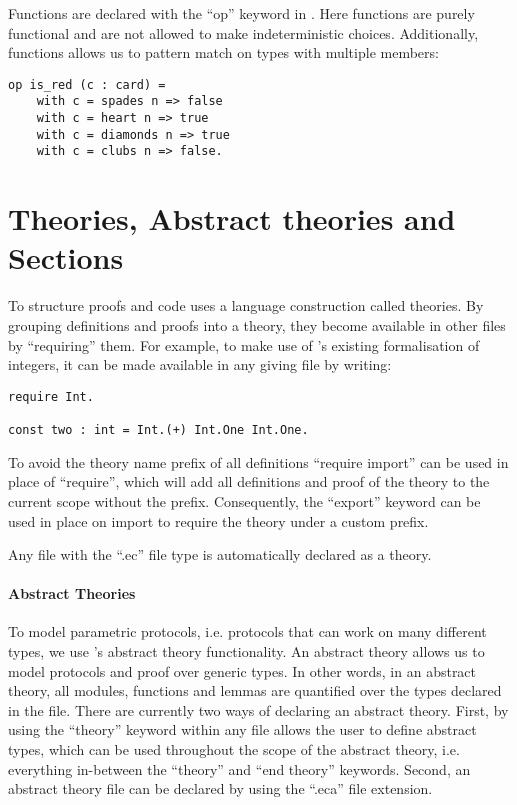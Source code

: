 \noindent
Functions are declared with the ``op'' keyword in \easycrypt.
Here functions are purely functional and are not allowed to make indeterministic
choices. Additionally, functions allows us to pattern match on types with
multiple members:
\begin{lstlisting}
op is_red (c : card) =
    with c = spades n => false
    with c = heart n => true
    with c = diamonds n => true
    with c = clubs n => false.
\end{lstlisting}


\section{Theories, Abstract theories and Sections}
\label{sec:ec_theories}
To structure proofs and code \easycrypt uses a language construction called
theories. By grouping definitions and proofs into a theory, they become available
in other files by ``requiring'' them. For example, to make use of \easycrypt's
existing formalisation of integers, it can be made available in any giving file
by writing:

\begin{lstlisting}[float,label=lst:theory_require,caption=\easycrypt theories: importing definitions]
require Int.

const two : int = Int.(+) Int.One Int.One.
\end{lstlisting}

To avoid the theory name prefix of all definitions ``require import'' can be
used in place of ``require'', which will add all definitions and proof of the
theory to the current scope without the prefix. Consequently, the ``export''
keyword can be used in place on import to require the theory under a custom prefix.

Any \easycrypt file with the ``.ec'' file type is automatically declared as a
theory.

\paragraph{Abstract Theories}
To model parametric protocols, i.e. protocols that can work on many different
types, we use \easycrypt's abstract theory functionality. An abstract theory allows us to model
protocols and proof over generic types. In other words, in an abstract theory,
all modules, functions and lemmas are quantified over the types declared in the file.
There are currently two ways of declaring an abstract theory. First, by using the
``theory'' keyword within any file allows the user to define abstract types,
which can be used throughout the scope of the abstract theory, i.e. everything
in-between the ``theory'' and ``end theory'' keywords. Second, an abstract
theory file can be declared by using the ``.eca'' file extension.

